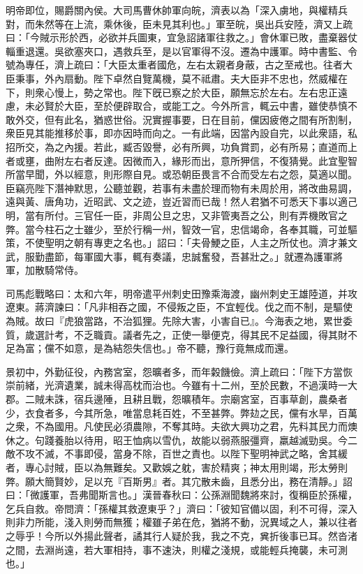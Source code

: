 \begin{pinyinscope}
明帝即位，賜爵關內侯。大司馬曹休帥軍向皖，濟表以為「深入虜地，與權精兵對，而朱然等在上流，乘休後，臣未見其利也。」軍至皖，吳出兵安陸，濟又上疏曰：「今賊示形於西，必欲并兵圖東，宜急詔諸軍往救之。」會休軍已敗，盡棄器仗輜重退還。吳欲塞夾口，遇救兵至，是以官軍得不沒。遷為中護軍。時中書監、令號為專任，濟上疏曰：「大臣太重者國危，左右太親者身蔽，古之至戒也。往者大臣秉事，外內扇動。陛下卓然自覽萬機，莫不祗肅。夫大臣非不忠也，然威權在下，則衆心慢上，勢之常也。陛下旣已察之於大臣，願無忘於左右。左右忠正遠慮，未必賢於大臣，至於便辟取合，或能工之。今外所言，輒云中書，雖使恭慎不敢外交，但有此名，猶惑世俗。況實握事要，日在目前，儻因疲倦之間有所割制，衆臣見其能推移於事，即亦因時而向之。一有此端，因當內設自完，以此衆語，私招所交，為之內援。若此，臧否毀譽，必有所興，功負賞罰，必有所易；直道而上者或壅，曲附左右者反達。因微而入，緣形而出，意所狎信，不復猜覺。此宜聖智所當早聞，外以經意，則形際自見。或恐朝臣畏言不合而受左右之怨，莫適以聞。臣竊亮陛下潛神默思，公聽並觀，若事有未盡於理而物有未周於用，將改曲易調，遠與黃、唐角功，近昭武、文之迹，豈近習而已哉！然人君猶不可悉天下事以適己明，當有所付。三官任一臣，非周公旦之忠，又非管夷吾之公，則有弄機敗官之弊。當今柱石之士雖少，至於行稱一州，智效一官，忠信竭命，各奉其職，可並驅策，不使聖明之朝有專吏之名也。」詔曰：「夫骨鯁之臣，人主之所仗也。濟才兼文武，服勤盡節，每軍國大事，輒有奏議，忠誠奮發，吾甚壯之。」就遷為護軍將軍，加散騎常侍。

司馬彪戰略曰：太和六年，明帝遣平州刺史田豫乘海渡，幽州刺史王雄陸道，并攻遼東。蔣濟諫曰：「凡非相吞之國，不侵叛之臣，不宜輕伐。伐之而不制，是驅使為賊。故曰『虎狼當路，不治狐狸。先除大害，小害自已』。今海表之地，累世委質，歲選計考，不乏職貢。議者先之，正使一舉便克，得其民不足益國，得其財不足為富；儻不如意，是為結怨失信也。」帝不聽，豫行竟無成而還。

景初中，外勤征役，內務宮室，怨曠者多，而年糓饑儉。濟上疏曰：「陛下方當恢崇前緒，光濟遺業，誠未得高枕而治也。今雖有十二州，至於民數，不過漢時一大郡。二賊未誅，宿兵邊陲，且耕且戰，怨曠積年。宗廟宮室，百事草創，農桑者少，衣食者多，今其所急，唯當息耗百姓，不至甚弊。弊攰之民，儻有水旱，百萬之衆，不為國用。凡使民必須農隙，不奪其時。夫欲大興功之君，先料其民力而燠休之。句踐養胎以待用，昭王恤病以雪仇，故能以弱燕服彊齊，羸越滅勁吳。今二敵不攻不滅，不事即侵，當身不除，百世之責也。以陛下聖明神武之略，舍其緩者，專心討賊，臣以為無難矣。又歡娛之躭，害於精爽；神太用則竭，形太勞則弊。願大簡賢妙，足以充『百斯男』者。其宂散未齒，且悉分出，務在清靜。」詔曰：「微護軍，吾弗聞斯言也。」漢晉春秋曰：公孫淵聞魏將來討，復稱臣於孫權，乞兵自救。帝問濟：「孫權其救遼東乎？」濟曰：「彼知官備以固，利不可得，深入則非力所能，淺入則勞而無獲；權雖子弟在危，猶將不動，況異域之人，兼以往者之辱乎！今所以外揚此聲者，譎其行人疑於我，我之不克，兾折後事已耳。然沓渚之間，去淵尚遠，若大軍相持，事不速決，則權之淺規，或能輕兵掩襲，未可測也。」


\end{pinyinscope}
